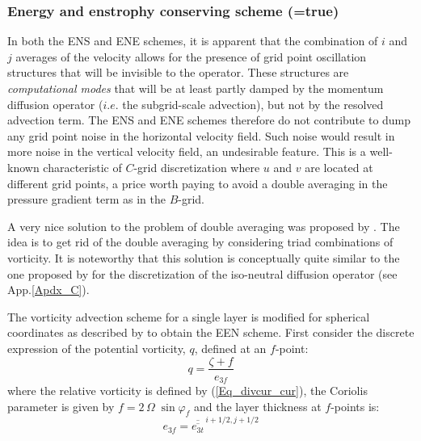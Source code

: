 \subsubsection{Energy and enstrophy conserving scheme (=true) }
\label{DYN_vor_een}

In both the ENS and ENE schemes, it is apparent that the combination of $i$ and $j$ 
averages of the velocity allows for the presence of grid point oscillation structures 
that will be invisible to the operator. These structures are \textit{computational modes} 
that will be at least partly damped by the momentum diffusion operator ($i.e.$ the 
subgrid-scale advection), but not by the resolved advection term. The ENS and ENE schemes
therefore do not contribute to dump any grid point noise in the horizontal velocity field.
Such noise would result in more noise in the vertical velocity field, an undesirable feature. 
This is a well-known characteristic of $C$-grid discretization where $u$ and $v$ are located 
at different grid points, a price worth paying to avoid a double averaging in the pressure 
gradient term as in the $B$-grid. 

A very nice solution to the problem of double averaging was proposed by \citet{Arakawa_Hsu_MWR90}. 
The idea is to get rid of the double averaging by considering triad combinations of vorticity. 
It is noteworthy that this solution is conceptually quite similar to the one proposed by
\citep{Griffies_al_JPO98} for the discretization of the iso-neutral diffusion operator (see App.\ref{Apdx_C}).

The \citet{Arakawa_Hsu_MWR90} vorticity advection scheme for a single layer is modified 
for spherical coordinates as described by \citet{Arakawa_Lamb_MWR81} to obtain the EEN scheme. 
First consider the discrete expression of the potential vorticity, $q$, defined at an $f$-point: 
\begin{equation} \label{Eq_pot_vor}
q  = \frac{\zeta +f} {e_{3f} }
\end{equation}
where the relative vorticity is defined by (\ref{Eq_divcur_cur}), the Coriolis parameter 
is given by $f=2 \,\Omega \;\sin \varphi _f $ and the layer thickness at $f$-points is: 
\begin{equation} \label{Eq_een_e3f}
e_{3f} = \overline{\overline {e_{3t} }} ^{\,i+1/2,j+1/2}
\end{equation}

